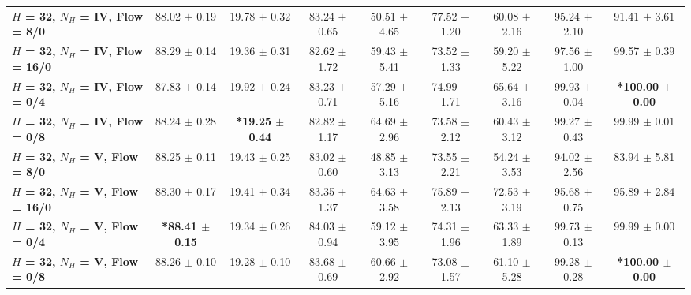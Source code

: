 \begin{table*}[ht]
{\begin{tabular}{lcccccccc}
        \midrule
        \textbf{$H$ = 32, $N_H$ = IV, Flow = 8/0} & 88.02 $\pm$ 0.19 & 19.78 $\pm$ 0.32 & 83.24 $\pm$ 0.65 & 50.51 $\pm$ 4.65 & 77.52 $\pm$ 1.20 & 60.08 $\pm$ 2.16 & 95.24 $\pm$ 2.10 & 91.41 $\pm$ 3.61 \\
        \textbf{$H$ = 32, $N_H$ = IV, Flow = 16/0} & 88.29 $\pm$ 0.14 & 19.36 $\pm$ 0.31 & 82.62 $\pm$ 1.72 & 59.43 $\pm$ 5.41 & 73.52 $\pm$ 1.33 & 59.20 $\pm$ 5.22 & 97.56 $\pm$ 1.00 & 99.57 $\pm$ 0.39 \\
        \textbf{$H$ = 32, $N_H$ = IV, Flow = 0/4} & 87.83 $\pm$ 0.14 & 19.92 $\pm$ 0.24 & 83.23 $\pm$ 0.71 & 57.29 $\pm$ 5.16 & 74.99 $\pm$ 1.71 & 65.64 $\pm$ 3.16 & 99.93 $\pm$ 0.04 & \textbf{*100.00 $\pm$ 0.00} \\
        \textbf{$H$ = 32, $N_H$ = IV, Flow = 0/8} & 88.24 $\pm$ 0.28 & \textbf{*19.25 $\pm$ 0.44} & 82.82 $\pm$ 1.17 & 64.69 $\pm$ 2.96 & 73.58 $\pm$ 2.12 & 60.43 $\pm$ 3.12 & 99.27 $\pm$ 0.43 & 99.99 $\pm$ 0.01 \\
        \midrule
        \textbf{$H$ = 32, $N_H$ = V, Flow = 8/0} & 88.25 $\pm$ 0.11 & 19.43 $\pm$ 0.25 & 83.02 $\pm$ 0.60 & 48.85 $\pm$ 3.13 & 73.55 $\pm$ 2.21 & 54.24 $\pm$ 3.53 & 94.02 $\pm$ 2.56 & 83.94 $\pm$ 5.81 \\
        \textbf{$H$ = 32, $N_H$ = V, Flow = 16/0} & 88.30 $\pm$ 0.17 & 19.41 $\pm$ 0.34 & 83.35 $\pm$ 1.37 & 64.63 $\pm$ 3.58 & 75.89 $\pm$ 2.13 & 72.53 $\pm$ 3.19 & 95.68 $\pm$ 0.75 & 95.89 $\pm$ 2.84 \\
        \textbf{$H$ = 32, $N_H$ = V, Flow = 0/4} & \textbf{*88.41 $\pm$ 0.15} & 19.34 $\pm$ 0.26 & 84.03 $\pm$ 0.94 & 59.12 $\pm$ 3.95 & 74.31 $\pm$ 1.96 & 63.33 $\pm$ 1.89 & 99.73 $\pm$ 0.13 & 99.99 $\pm$ 0.00 \\
        \textbf{$H$ = 32, $N_H$ = V, Flow = 0/8} & 88.26 $\pm$ 0.10 & 19.28 $\pm$ 0.10 & 83.68 $\pm$ 0.69 & 60.66 $\pm$ 2.92 & 73.08 $\pm$ 1.57 & 61.10 $\pm$ 5.28 & 99.28 $\pm$ 0.28 & \textbf{*100.00 $\pm$ 0.00} \\
        \bottomrule
    \end{tabular}
    }
\end{table*}

